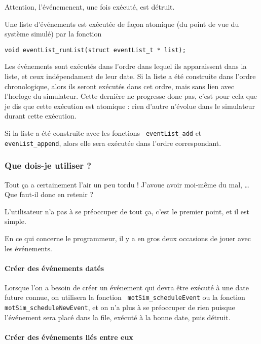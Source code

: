    Attention, l'événemenent, une fois exécuté, est détruit.

   Une liste d'événements est exécutée de façon atomique (du point de
vue du système simulé) par la fonction

\begin{verbatim}
void eventList_runList(struct eventList_t * list);
\end{verbatim}

   Les événements sont exécutés dans l'ordre dans lequel ils
apparaissent dans la liste, et ceux indépendament de leur date. Si la
liste a été construite dans l'ordre chronologique, alors ils seront
exécutés dans cet ordre, mais sans lien avec l'horloge du
simulateur. Cette dernière ne progresse donc pas, c'est pour cela que
je dis que cette exécution est atomique : rien d'autre n'évolue dans
le simulateur durant cette exécution.

   Si la liste a été construite avec les fonctions {\tt
eventList\_add} et {\tt evenList\_append}, alors elle sera exécutée
dans l'ordre correspondant.

%
\subsubsection{Que dois-je utiliser ?}

   Tout ça a certainement l'air un peu tordu ! J'avoue avoir moi-même
du mal, \ldots Que faut-il donc en retenir ?

   L'utilisateur n'a pas à se préoccuper de tout ça, c'est le premier
point, et il est simple.

   En ce qui concerne le programmeur, il y a en gros deux occasions de
jouer avec les événements.

%
%
%
\paragraph{Créer des événements datés}

   Lorsque l'on a besoin de créer un événement qui devra être exécuté
à une date future connue, on utilisera la fonction {\tt
  motSim\_scheduleEvent} ou la fonction {\tt
  motSim\_scheduleNewEvent}, et on n'a plus à se préoccuper de rien
puisque l'événement sera placé dans la file, exécuté à la bonne date,
puis détruit. 

%
%
%
\paragraph{Créer des événements liés entre eux}

